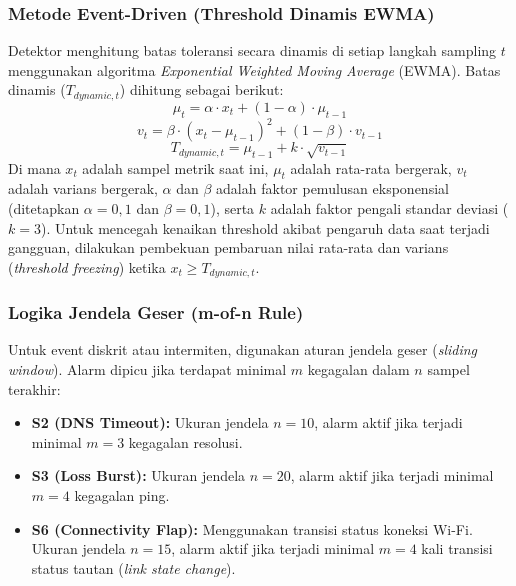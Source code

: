 \subsubsection{Metode Event-Driven (Threshold Dinamis EWMA)}
Detektor menghitung batas toleransi secara dinamis di setiap langkah sampling $t$ menggunakan algoritma \textit{Exponential Weighted Moving Average} (EWMA). Batas dinamis ($T_{dynamic, t}$) dihitung sebagai berikut:
\begin{equation}
\mu_t = \alpha \cdot x_t + (1 - \alpha) \cdot \mu_{t-1}
\end{equation}
\begin{equation}
v_t = \beta \cdot (x_t - \mu_{t-1})^2 + (1 - \beta) \cdot v_{t-1}
\end{equation}
\begin{equation}
T_{dynamic, t} = \mu_{t-1} + k \cdot \sqrt{v_{t-1}}
\end{equation}
Di mana $x_t$ adalah sampel metrik saat ini, $\mu_t$ adalah rata-rata bergerak, $v_t$ adalah varians bergerak, $\alpha$ dan $\beta$ adalah faktor pemulusan eksponensial (ditetapkan $\alpha = 0,1$ dan $\beta = 0,1$), serta $k$ adalah faktor pengali standar deviasi ($k = 3$). Untuk mencegah kenaikan threshold akibat pengaruh data saat terjadi gangguan, dilakukan pembekuan pembaruan nilai rata-rata dan varians (\textit{threshold freezing}) ketika $x_t \ge T_{dynamic, t}$.

\subsubsection{Logika Jendela Geser (m-of-n Rule)}
Untuk event diskrit atau intermiten, digunakan aturan jendela geser (\textit{sliding window}). Alarm dipicu jika terdapat minimal $m$ kegagalan dalam $n$ sampel terakhir:
\begin{itemize}
    \item \textbf{S2 (DNS Timeout):} Ukuran jendela $n = 10$, alarm aktif jika terjadi minimal $m = 3$ kegagalan resolusi.
    \item \textbf{S3 (Loss Burst):} Ukuran jendela $n = 20$, alarm aktif jika terjadi minimal $m = 4$ kegagalan ping.
    \item \textbf{S6 (Connectivity Flap):} Menggunakan transisi status koneksi Wi-Fi. Ukuran jendela $n = 15$, alarm aktif jika terjadi minimal $m = 4$ kali transisi status tautan (\textit{link state change}).
\end{itemize}

